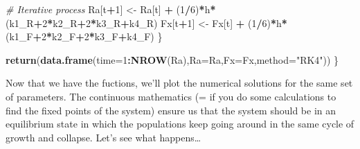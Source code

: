\documentclass[12pt,]{book}
\newenvironment{Shaded}{\begin{snugshade}}{\end{snugshade}}
\newcommand{\CommentTok}[1]{\textcolor[rgb]{0.56,0.35,0.01}{\textit{#1}}}
\newcommand{\DataTypeTok}[1]{\textcolor[rgb]{0.13,0.29,0.53}{#1}}
\newcommand{\DecValTok}[1]{\textcolor[rgb]{0.00,0.00,0.81}{#1}}
\newcommand{\KeywordTok}[1]{\textcolor[rgb]{0.13,0.29,0.53}{\textbf{#1}}}
\newcommand{\NormalTok}[1]{#1}
\newcommand{\OperatorTok}[1]{\textcolor[rgb]{0.81,0.36,0.00}{\textbf{#1}}}
\newcommand{\StringTok}[1]{\textcolor[rgb]{0.31,0.60,0.02}{#1}}
\begin{document}
\begin{Shaded}
\begin{Highlighting}[]
  \CommentTok{# Iterative process}
\NormalTok{  Ra[t}\OperatorTok{+}\DecValTok{1}\NormalTok{] <-}\StringTok{ }\NormalTok{Ra[t] }\OperatorTok{+}\StringTok{ }\NormalTok{(}\DecValTok{1}\OperatorTok{/}\DecValTok{6}\NormalTok{)}\OperatorTok{*}\NormalTok{h}\OperatorTok{*}\NormalTok{(k1_R}\OperatorTok{+}\DecValTok{2}\OperatorTok{*}\NormalTok{k2_R}\OperatorTok{+}\DecValTok{2}\OperatorTok{*}\NormalTok{k3_R}\OperatorTok{+}\NormalTok{k4_R)}
\NormalTok{  Fx[t}\OperatorTok{+}\DecValTok{1}\NormalTok{] <-}\StringTok{ }\NormalTok{Fx[t] }\OperatorTok{+}\StringTok{ }\NormalTok{(}\DecValTok{1}\OperatorTok{/}\DecValTok{6}\NormalTok{)}\OperatorTok{*}\NormalTok{h}\OperatorTok{*}\NormalTok{(k1_F}\OperatorTok{+}\DecValTok{2}\OperatorTok{*}\NormalTok{k2_F}\OperatorTok{+}\DecValTok{2}\OperatorTok{*}\NormalTok{k3_F}\OperatorTok{+}\NormalTok{k4_F)}
\NormalTok{  \}}
  
  \KeywordTok{return}\NormalTok{(}\KeywordTok{data.frame}\NormalTok{(}\DataTypeTok{time=}\DecValTok{1}\OperatorTok{:}\KeywordTok{NROW}\NormalTok{(Ra),}\DataTypeTok{Ra=}\NormalTok{Ra,}\DataTypeTok{Fx=}\NormalTok{Fx,}\DataTypeTok{method=}\StringTok{"RK4"}\NormalTok{))}
\NormalTok{\}}
\end{Highlighting}
\end{Shaded}

Now that we have the fuctions, we'll plot the numerical solutions for the same set of parameters. The continuous mathematics (= if you do some calculations to find the fixed points of the system) ensure us that the system should be in an equilibrium state in which the populations keep going around in the same cycle of growth and collapse. Let's see what happens\ldots{}
\end{document}
